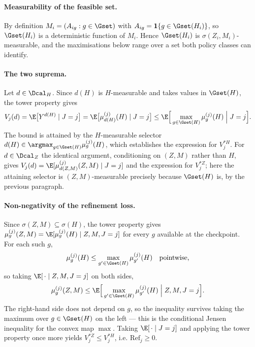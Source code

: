 \paragraph{Measurability of the feasible set.}
By definition $M_i=(A_{ig}:g\in\Gset)$ with
$A_{ig}=\mathbf 1\{g\in\Gset(H_i)\}$, so $\Gset(H_i)$ is a deterministic
function of $M_i$.  Hence $\Gset(H_i)$ is $\sigma(Z_i,M_i)$-measurable, and the
maximisations below range over a set both policy classes can identify.

\paragraph{The two suprema.}
Let $d\in\Dcal_H$.  Since $d(H)$ is $H$-measurable and takes values in
$\Gset(H)$, the tower property gives
\begin{equation}
 V_j(d)=\E\big[Y^{d(H)}\mid J=j\big]
       =\E\big[\mu^{(j)}_{d(H)}(H)\mid J=j\big]
       \le\E\Big[\max_{g\in\Gset(H)}\mu^{(j)}_g(H)\;\Big|\;J=j\Big].
\end{equation}
The bound is attained by the $H$-measurable selector
$d(H)\in\argmax_{g\in\Gset(H)}\mu^{(j)}_g(H)$, which establishes the expression
for $V^{*H}_j$.  For $d\in\Dcal_Z$ the identical argument, conditioning on
$(Z,M)$ rather than $H$, gives
$V_j(d)=\E[\mu^{(j)}_{d(Z,M)}(Z,M)\mid J=j]$ and the expression for $V^{*Z}_j$;
here the attaining selector is $(Z,M)$-measurable precisely because $\Gset(H)$
is, by the previous paragraph.

\paragraph{Non-negativity of the refinement loss.}
Since $\sigma(Z,M)\subseteq\sigma(H)$, the tower property gives
$\mu^{(j)}_g(Z,M)=\E[\mu^{(j)}_g(H)\mid Z,M,J=j]$ for every $g$ available at the
checkpoint.  For each such $g$,
\begin{equation}
 \mu^{(j)}_g(H)\le\max_{g'\in\Gset(H)}\mu^{(j)}_{g'}(H)
 \quad\text{pointwise,}
\end{equation}
so taking $\E[\,\cdot\mid Z,M,J=j]$ on both sides,
\begin{equation}
 \mu^{(j)}_g(Z,M)\le\E\Big[\max_{g'\in\Gset(H)}\mu^{(j)}_{g'}(H)\;\Big|\;Z,M,J=j\Big].
\end{equation}
The right-hand side does not depend on $g$, so the inequality survives taking
the maximum over $g\in\Gset(H)$ on the left --- this is the conditional Jensen
inequality for the convex map $\max$.  Taking $\E[\,\cdot\mid J=j]$ and applying
the tower property once more yields $V^{*Z}_j\le V^{*H}_j$, i.e.
$\mathrm{Ref}_j\ge0$.

